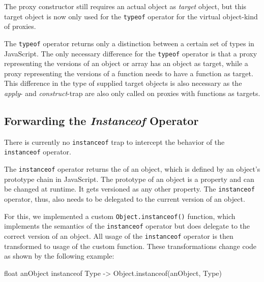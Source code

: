 The proxy constructor still requires an actual object as \emph{target} object, but this target object is now only used for the \lstinline{typeof} operator for the virtual object-kind of proxies.

The \lstinline{typeof} operator returns only a distinction between a certain set of types in JavaScript.
The only necessary difference for the \lstinline{typeof} operator is that a proxy representing the versions of an object or array has an object as target, while a proxy representing the versions of a function needs to have a function as target.
This difference in the type of supplied target objects is also necessary as the \emph{apply}- and \emph{construct}-trap are also only called on proxies with functions as targets.


\subsection{Forwarding the \emph{Instanceof} Operator}

There is currently no \lstinline{instanceof} trap to intercept the behavior of the \lstinline{instanceof} operator.

The \lstinline{instanceof} operator returns the of an object, which is defined by an object's prototype chain in JavaScript.
The prototype of an object is a property and can be changed at runtime.
It gets versioned as any other property.
The \lstinline{instanceof} operator, thus, also needs to be delegated to the current version of an object.

For this, we implemented a custom \lstinline{Object.instanceof()} function, which implements the semantics of the \lstinline{instanceof} operator but does delegate to the correct version of an object.
All usage of the \lstinline{instanceof} operator is then transformed to usage of the custom function.
These transformations change code as shown by the following example: 

\iffalse
\begin{verbatim}\fi
\begin{code}[]{}{float}
anObject instanceof Type -> Object.instanceof(anObject, Type)
\end{code}
\iffalse
\end{verbatim}\fi

